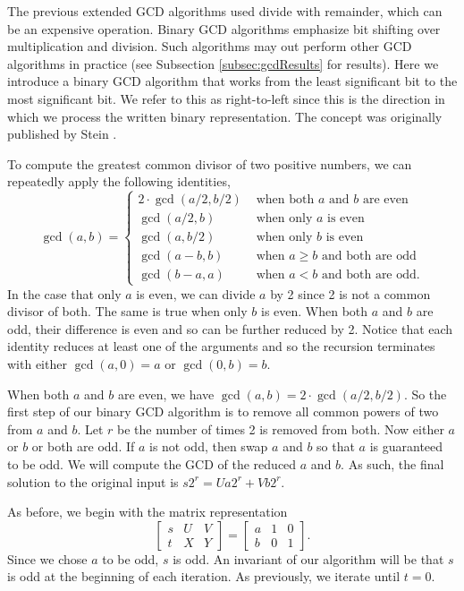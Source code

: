 \documentclass{ucalgthes1}
\theoremstyle{definition}
\newcommand{\matrixThreeTwo}[6]{\left[ \begin{array}{rrr} #1 & #2 & #3 \\ #4 & #5 & #6 \end{array} \right]}
\begin{document}
The previous extended GCD algorithms used divide with remainder, which can be an expensive operation.  Binary GCD algorithms emphasize bit shifting over multiplication and division.  Such algorithms may out perform other GCD algorithms in practice (see Subsection \ref{subsec:gcdResults} for results).  Here we introduce a binary GCD algorithm that works from the least significant bit to the most significant bit.  We refer to this as right-to-left since this is the direction in which we process the written binary representation.  The concept was originally published by Stein \cite{Stein1967}.

To compute the greatest common divisor of two positive numbers, we can repeatedly apply the following identities,
\[
	\gcd(a, b) = \begin{cases}
		2 \cdot \gcd(a/2, b/2) & \textrm{ when both $a$ and $b$ are even} \\
		\gcd(a/2, b) & \textrm{ when only $a$ is even} \\
		\gcd(a, b/2) & \textrm{ when only $b$ is even} \\
		\gcd(a-b, b) & \textrm{ when $a \ge b$ and both are odd} \\
		\gcd(b-a, a) & \textrm{ when $a < b$ and both are odd}.
	\end{cases}
\]
In the case that only $a$ is even, we can divide $a$ by 2 since 2 is not a common divisor of both.  The same is true when only $b$ is even.  When both $a$ and $b$ are odd, their difference is even and so can be further reduced by 2.  Notice that each identity reduces at least one of the arguments and so the recursion terminates with either $\gcd(a, 0) = a$ or $\gcd(0, b) = b$.

When both $a$ and $b$ are even, we have $\gcd(a, b) = 2 \cdot \gcd(a/2, b/2)$.  So the first step of our binary GCD algorithm is to remove all common powers of two from $a$ and $b$.  Let $r$ be the number of times 2 is removed from both.  Now either $a$ or $b$ or both are odd.  If $a$ is not odd, then swap $a$ and $b$ so that $a$ is guaranteed to be odd.  We will compute the GCD of the reduced $a$ and $b$.  As such, the final solution to the original input is $s2^r = Ua2^r + Vb2^r$.

As before, we begin with the matrix representation
\[
	\matrixThreeTwo{s}{U}{V}{t}{X}{Y} = \matrixThreeTwo{a}{1}{0}{b}{0}{1}.
\]
Since we chose $a$ to be odd, $s$ is odd.  An invariant of our algorithm will be that $s$ is odd at the beginning of each iteration.  As previously, we iterate until $t=0$.
\end{document}

